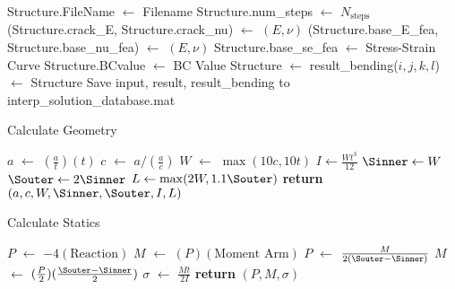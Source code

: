\begin{algorithm}[tbp]
\begin{algorithmic}
            \State Structure.FileName $\gets$ Filename
            \State Structure.num\_steps $\gets$ \(N_\text{steps}\)
            \State (Structure.crack\_E, Structure.crack\_nu) $\gets$ \((E, \nu)\)
            \State (Structure.base\_E\_fea, Structure.base\_nu\_fea) $\gets$ \((E, \nu)\)
            \State Structure.base\_se\_fea $\gets$ Stress-Strain Curve
            \State Structure.BCvalue $\gets$ BC Value
            \State Structure $\gets$ 
            \State result\_bending(\(i, j, k, l\)) $\gets$ Structure
          \EndFor
        \EndFor
      \EndFor
    \EndFor
    \State Save input, result, result\_bending to interp\_solution\_database.mat
    \EndProcedure
  \end{algorithmic}
\end{algorithm}

\begin{algorithm}[tbp]
  \caption{Calculate Geometry}
  \label{alg:calculate_geometry}
  \begin{algorithmic}
    \State \(a\) $\gets$ \((\frac{a}{t})(t)\)
    \State \(c\) $\gets$ \(a/(\frac{a}{c})\)
    \State \(W\) $\gets$ $\max(10c, 10t)$ 
    \State \(I \gets \frac{W t^3}{12}\)
    \State \(\Sinner \gets W\) 
    \State \(\Souter \gets 2 \Sinner \) 
    \State \(L \gets \max(2W, 1.1 \Souter)\) 
    \State \textbf{return} \((a, c, W, \Sinner, \Souter, I, L)\)
    \EndProcedure
  \end{algorithmic}
\end{algorithm}

\begin{algorithm}[tbp]
  \caption{Calculate Statics}
  \label{alg:calculate_statics}
  \begin{algorithmic}
    \State \(P\) $\gets$ \(-4(\text{Reaction})\) 
    \State {}
    \State \(M\) $\gets$ \((P)(\text{Moment Arm})\) 
    \State \(P\) $\gets$ \(\frac{M}{2(\Souter-\Sinner)}\) 
    \State \(M\) $\gets$ \((\frac{P}{2})(\frac{\Souter-\Sinner}{2})\) 
    \State \(\sigma\) $\gets$ \(\frac{M t}{2 I}\) 
    \State \textbf{return} \((P, M, \sigma)\)
    \EndProcedure
  \end{algorithmic}
\end{algorithm}

